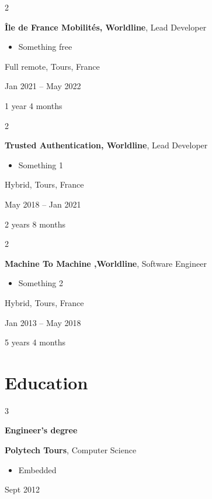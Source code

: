 \documentclass[10pt, letterpaper]{article}
\newenvironment{highlights}{
    \begin{itemize}[
        topsep=0.10 cm,
        parsep=0.10 cm,
        partopsep=0pt,
        itemsep=0pt,
        leftmargin=0.4 cm + 10pt
    ]
}{
    \end{itemize}
} %
\newenvironment{twocolentry}[2][]{
    \onecolentry
    \def\secondColumn{#2}
    \setcolumnwidth{\fill, 4.5 cm}
    \begin{paracol}{2}
}{
    \switchcolumn \raggedleft \secondColumn
    \end{paracol}
    \endonecolentry
} %
\newenvironment{threecolentry}[3][]{
    \onecolentry
    \def\thirdColumn{#3}
    \setcolumnwidth{1 cm, \fill, 4.5 cm}
    \begin{paracol}{3}
    {\raggedright #2} \switchcolumn
}{
    \switchcolumn \raggedleft \thirdColumn
    \end{paracol}
    \endonecolentry
} %
\begin{document}
        \vspace{0.2 cm}

        \begin{twocolentry}{
            Full remote, Tours, France

        Jan 2021 – May 2022

        1 year 4 months
        }
            \textbf{Île de France Mobilités, Worldline}, Lead Developer
            \begin{highlights}
                \item Something free
            \end{highlights}
        \end{twocolentry}


        \vspace{0.2 cm}

        \begin{twocolentry}{
            Hybrid, Tours, France

        May 2018 – Jan 2021

        2 years 8 months
        }
            \textbf{Trusted Authentication, Worldline}, Lead Developer
            \begin{highlights}
                \item Something 1
            \end{highlights}
        \end{twocolentry}


        \vspace{0.2 cm}

        \begin{twocolentry}{
            Hybrid, Tours, France

        Jan 2013 – May 2018

        5 years 4 months
        }
            \textbf{Machine To Machine ,Worldline}, Software Engineer
            \begin{highlights}
                \item Something 2
            \end{highlights}
        \end{twocolentry}



    
    \section{Education}



        
        \begin{threecolentry}{\textbf{Engineer's degree}}{
            Sept 2012
        }
            \textbf{Polytech Tours}, Computer Science
            \begin{highlights}
                \item Embedded
            \end{highlights}
        \end{threecolentry}
\end{document}
